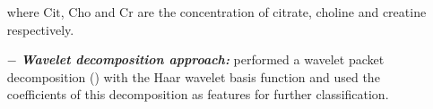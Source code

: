 \begin{enumerate}[leftmargin=*]
\noindent where $\text{Cit}$, $\text{Cho}$ and $\text{Cr}$ are the concentration of citrate, choline and creatine respectively.

\item[$-$] \textbf{\textit{Wavelet decomposition approach:}} \cite{Tiwari2012} performed a wavelet packet decomposition (\cite{Coifman1992}) with the Haar wavelet basis function and used the coefficients of this decomposition as features for further classification.

\end{enumerate}